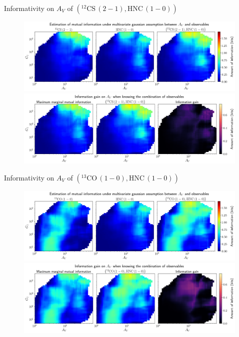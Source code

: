 \documentclass{beamer}
\begin{document}
\begin{frame}{Informativity on $A_V$ of $\left(\mathrm{^{12}CS\,(2-1)},\mathrm{HNC\,(1-0)}\right)$}
    \begin{figure}
        \centering
        \includegraphics[width=0.95\linewidth]{../linearinfogauss/av__12cs21_hnc10_linearinfogauss.png}
        \vfill
        \includegraphics[width=0.95\linewidth]{../linearinfogauss/av__12cs21_hnc10_linearinfogauss_gain.png}
    \end{figure}
\end{frame}

\begin{frame}{Informativity on $A_V$ of $\left(\mathrm{^{13}CO\,(1-0)},\mathrm{HNC\,(1-0)}\right)$}
    \begin{figure}
        \centering
        \includegraphics[width=0.95\linewidth]{../linearinfogauss/av__13co10_hnc10_linearinfogauss.png}
        \vfill
        \includegraphics[width=0.95\linewidth]{../linearinfogauss/av__13co10_hnc10_linearinfogauss_gain.png}
    \end{figure}
\end{frame}
\end{document}
